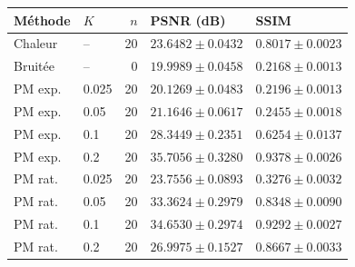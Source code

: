 \begin{tabular}{llrll}
\toprule
Méthode & $K$ & $n$ & PSNR (dB) & SSIM \\
\midrule
Chaleur & -- & 20 & $23.6482 \pm 0.0432$ & $0.8017 \pm 0.0023$ \\
Bruitée & -- & 0 & $19.9989 \pm 0.0458$ & $0.2168 \pm 0.0013$ \\
PM exp. & 0.025 & 20 & $20.1269 \pm 0.0483$ & $0.2196 \pm 0.0013$ \\
PM exp. & 0.05 & 20 & $21.1646 \pm 0.0617$ & $0.2455 \pm 0.0018$ \\
PM exp. & 0.1 & 20 & $28.3449 \pm 0.2351$ & $0.6254 \pm 0.0137$ \\
PM exp. & 0.2 & 20 & $35.7056 \pm 0.3280$ & $0.9378 \pm 0.0026$ \\
PM rat. & 0.025 & 20 & $23.7556 \pm 0.0893$ & $0.3276 \pm 0.0032$ \\
PM rat. & 0.05 & 20 & $33.3624 \pm 0.2979$ & $0.8348 \pm 0.0090$ \\
PM rat. & 0.1 & 20 & $34.6530 \pm 0.2974$ & $0.9292 \pm 0.0027$ \\
PM rat. & 0.2 & 20 & $26.9975 \pm 0.1527$ & $0.8667 \pm 0.0033$ \\
\bottomrule
\end{tabular}
